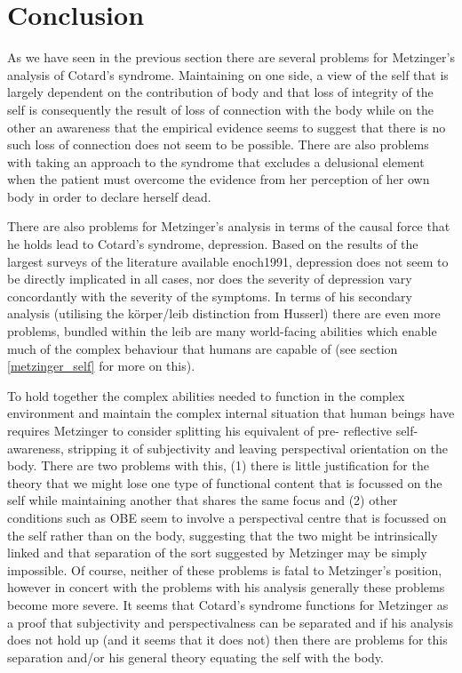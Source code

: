 \chapter{Conclusion}
\label{chap:conclusion}

As we have seen in the previous section there are several problems for Metzinger's analysis of Cotard's syndrome. Maintaining on one side, a view of the self that is largely dependent on the contribution of body and that loss of integrity of the self is consequently the result of loss of connection with the body while on the other an awareness that the empirical evidence seems to suggest that there is no such loss of connection does not seem to be possible. There are also problems with taking an approach to the syndrome that excludes a delusional element when the patient must overcome the evidence from her perception of her own body in order to declare herself dead.

There are also problems for Metzinger's analysis in terms of the causal force that he holds lead to Cotard's syndrome, depression. Based on the results of the largest surveys of the literature available \cite{berrios1995b}{enoch1991}, depression does not seem to be directly implicated in all cases, nor does the severity of depression vary concordantly with the severity of the symptoms. In terms of his secondary analysis (utilising the k\"{o}rper/leib distinction from Husserl) there are even more problems, bundled within the leib are many world-facing abilities which enable much of the complex behaviour that humans are capable of (see section \ref{metzinger_self} for more on this).

To hold together the complex abilities needed to function in the complex environment and maintain the complex internal situation that human beings have requires Metzinger to consider splitting his equivalent of pre- reflective self-awareness, stripping it of subjectivity and leaving perspectival orientation on the body. There are two problems with this, (1) there is little justification for the theory that we might lose one type of functional content that is focussed on the self while maintaining another that shares the same focus and (2) other conditions such as OBE seem to involve a perspectival centre that is focussed on the self rather than on the body, suggesting that the two might be intrinsically linked and that separation of the sort suggested by Metzinger may be simply impossible. Of course, neither of these problems is fatal to Metzinger's position, however in concert with the problems with his analysis generally these problems become more severe. It seems that Cotard's syndrome functions for Metzinger as a proof that subjectivity and perspectivalness can be separated and if his analysis does not hold up (and it seems that it does not) then there are problems for this separation and/or his general theory equating the self with the body.

